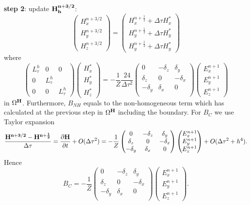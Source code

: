 \documentclass[12pt,reqno]{amsart}
\theoremstyle{definition}
\numberwithin{equation}{section}
\def\Gw{\Omega}     \def\Gx{\Xi}         \def\Gy{\Psi}
\begin{document}
	
	{\bf step 2}: update $\bf{H}^{n+3/2}_h$: \\[2mm]
	$$
	\begin{pmatrix}
		H_x^{n+3/2}\\
		H_y^{n+3/2}\\
		H_z^{n+3/2}
	\end{pmatrix}=
	\begin{pmatrix}
		H_x^{n+\frac{1}{2}}+\Delta \tau H_x^{*}\\
		H_y^{n+\frac{1}{2}}+\Delta \tau H_y^{*}\\
		H_y^{n+\frac{1}{2}}+\Delta \tau H_y^{*}
	\end{pmatrix}
	$$
	where 
	$$
	\begin{pmatrix}
		L_{\tau}^{h} & 0&0 \\
		0 & L_{\tau}^{h} &\\
		0&0&L_{\tau}^{h} 
	\end{pmatrix}
	\begin{pmatrix}
		H_x^{*}\\
		H_y^{*} \\
		H_z^{*}
	\end{pmatrix}=-\frac{1}{Z}\frac{24}{\Delta \tau^2}
	\begin{pmatrix}
		0& -\delta_z & \delta _y\\
		\delta_z&0&-\delta_x\\
		-\delta_y&\delta_x&0\\
	\end{pmatrix}
	\begin{pmatrix}
		E_x^{n+1}\\
		E_y^{n+1}\\
		E_z^{n+1}
	\end{pmatrix}
	$$
	in $\Gw^{\bf{H}}$. Furthermore,
	$B_{NH}$ equals to the non-homogeneous term which has calculated at the previous step in $\Gw^{\bf{H}}$ including the boundary.
	For $B_{C}$ we use Taylor expansion
	$$
	\frac{\bf{H}^{n+3/2}-\bf{H}^{n+\frac{1}{2}}}{\Delta \tau}=
	\frac{\partial \bf{H}}{\partial t}+O(\Delta \tau ^2)=
	-\frac{1}{Z}	\begin{pmatrix}
		0& -\delta_z & \delta _y\\
		\delta_z&0&-\delta_x\\
		-\delta_y&\delta_x&0\\
	\end{pmatrix}
	\begin{pmatrix}
		E_x^{n+1}\\
		E_y^{n+1}\\
		E_z^{n+1}
	\end{pmatrix}+O(\Delta \tau^2+h^4).
	$$
	Hence 
	$$B_C=
		-\frac{1}{Z}	\begin{pmatrix}
		0& -\delta_z & \delta _y\\
		\delta_z&0&-\delta_x\\
		-\delta_y&\delta_x&0\\
	\end{pmatrix}
	\begin{pmatrix}
		E_x^{n+1}\\
		E_y^{n+1}\\
		E_z^{n+1}
	\end{pmatrix}.
	$$
	
\end{document}

